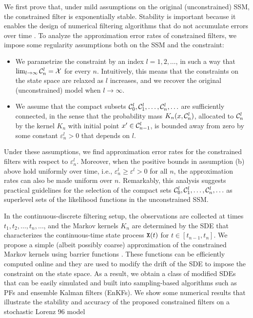 \documentclass[onefignum,onetabnum]{siamonline250211}%
\begin{document}
We first prove that, under mild assumptions on the original (unconstrained) SSM, the constrained filter is exponentially stable. Stability is important because it enables the design of numerical filtering algorithms that do not accumulate errors over time \cite{DelMoral01c}. To analyze the approximation error rates of constrained filters, we impose some regularity assumptions both on the SSM and the constraint:
\begin{itemize}
\item[(a)] We parametrize the constraint by an index $l = 1, 2, \ldots$, in such a way that $\lim_{l\to\infty} {\mathcal C}_n^l = {\mathcal X}$ for every $n$. Intuitively, this means that the constraints on the state space are relaxed as $l$ increases, and we recover the original (unconstrained) model when $l\to\infty$.
\item[(b)] We assume that the compact subsets ${\mathcal C}_0^l, {\mathcal C}_1^l, \ldots, {\mathcal C}_n^l, \ldots$ are sufficiently connected, in the sense that the probability mass $K_n(x,{\mathcal C}_n^l)$, allocated to ${\mathcal C}_n^l$ by the kernel $K_n$ with initial point $x' \in {\mathcal C}_{n-1}^l$, is bounded away from zero by some constant $\varepsilon_n^l>0$ that depends on $l$. 
\end{itemize}
Under these assumptions, we find approximation error rates for the constrained filters with respect to $\varepsilon_n^l$. Moreover, when the positive bounds in assumption (b) above hold uniformly over time, i.e., $\varepsilon_n^l \ge \varepsilon^l >0$ for all $n$, the approximation rates can also be made uniform over $n$. Remarkably, this analysis suggests practical guidelines for the selection of the compact sets ${\mathcal C}_0^l, {\mathcal C}_1^l, \ldots, {\mathcal C}_n^l, \ldots $ as superlevel sets of the likelihood functions in the unconstrained SSM.

In the continuous-discrete filtering setup, the observations are collected at times $t_1, t_2, \ldots, t_n, \ldots $, and the Markov kernels $K_n$ are determined by the SDE that characterizes the continuous-time state process $\mathtt{X}(t)$ for $t \in [t_{n-1}, t_n]$. We propose a simple (albeit possibly coarse) approximation of the constrained Markov kernels using barrier functions \cite{Margellos11,Clark21}. These functions can be efficiently computed online and they are used to modify the drift of the SDE to impose the constraint on the state space. As a result, we obtain a class of modified SDEs that can be easily simulated and built into sampling-based algorithms such as PFs and ensemble Kalman filters (EnKFs). We show some numerical results that illustrate the stability and accuracy of the proposed constrained filters on a stochastic Lorenz 96 model \cite{Grudzien20}
\end{document}
